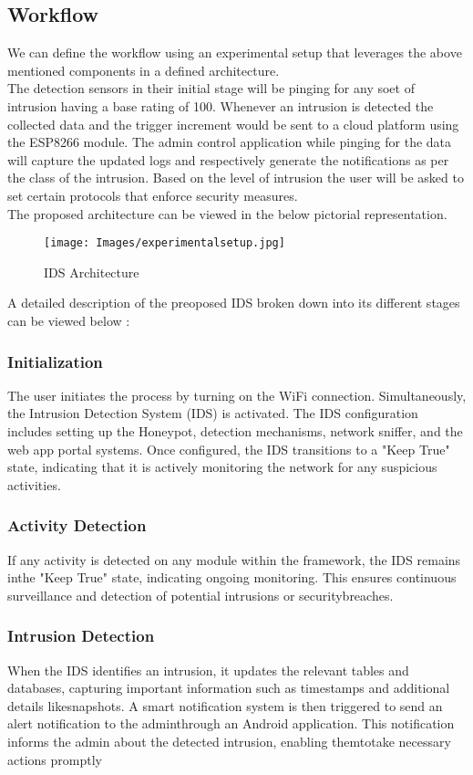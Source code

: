 \documentclass[letterpaper, 10 pt, conference]{ieeeconf}  %
\begin{document}
\subsection{Workflow}
We can define the workflow using an experimental setup that leverages the above mentioned components in a defined architecture. \\
The detection sensors in their initial stage will be pinging for any soet of intrusion having a base rating of 100. Whenever an intrusion is detected the collected data and the trigger increment would be sent to a cloud platform using the ESP8266 module. The admin control application while pinging for the data will capture the updated logs and respectively generate the notifications as per the class of the intrusion. Based on the level of intrusion the user will be asked to set certain protocols that enforce security measures. \\
The proposed architecture can be viewed in the below pictorial representation.\\
\begin{figure}[thpb]
      \centering
      {{\texttt{[image: Images/experimentalsetup.jpg]}}}
      \caption{IDS Architecture}
      \label{fig:2}
\end{figure}
A detailed description of the preoposed IDS broken down into its different stages can be viewed below : \\
\subsubsection{Initialization}
The user initiates the process by turning on the WiFi connection. Simultaneously, the Intrusion Detection System (IDS) is activated. The IDS configuration includes setting up the Honeypot, detection mechanisms, network sniffer, and the web app portal systems. Once configured, the IDS transitions to a "Keep True" state, indicating that it is
actively monitoring the network for any suspicious activities.

\subsubsection{Activity Detection}
If any activity is detected on any module within the framework, the IDS remains inthe "Keep True" state, indicating ongoing monitoring. This ensures continuous surveillance and detection of potential intrusions or securitybreaches.

\subsubsection{Intrusion Detection}
When the IDS identifies an intrusion, it updates the relevant tables and databases, capturing important information such as timestamps and additional details likesnapshots. A smart notification system is then triggered to send an alert notification to the adminthrough an Android application. This notification informs the admin about the detected intrusion, enabling themtotake necessary actions promptly
\end{document}
